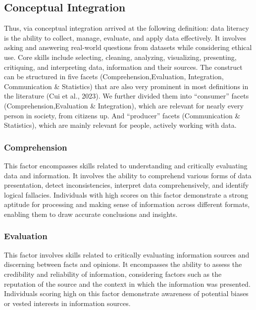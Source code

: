 \documentclass[
  12pt,
  a4paper,
  twoside]{article}
\begin{document}
\subsection{Conceptual Integration}\label{conceptual-integration}

Thus, via conceptual integration arrived at the following definition:
data literacy is the ability to collect, manage, evaluate, and apply
data effectively. It involves asking and answering real-world questions
from datasets while considering ethical use. Core skills include
selecting, cleaning, analyzing, visualizing, presenting, critiquing, and
interpreting data, information and their sources. The construct can be
structured in five facets (Comprehension,Evaluation, Integration,
Communication \& Statistics) that are also very prominent in most
definitions in the literature (Cui et al., 2023). We further divided
them into ``consumer'' facets (Comprehension,Evaluation \& Integration),
which are relevant for nearly every person in society, from citizens up.
And ``producer'' facets (Communication \& Statistics), which are mainly
relevant for people, actively working with data.

\subsubsection{Comprehension}\label{comprehension}

This factor encompasses skills related to understanding and critically
evaluating data and information. It involves the ability to comprehend
various forms of data presentation, detect inconsistencies, interpret
data comprehensively, and identify logical fallacies. Individuals with
high scores on this factor demonstrate a strong aptitude for processing
and making sense of information across different formats, enabling them
to draw accurate conclusions and insights.

\subsubsection{Evaluation}\label{evaluation}

This factor involves skills related to critically evaluating information
sources and discerning between facts and opinions. It encompasses the
ability to assess the credibility and reliability of information,
considering factors such as the reputation of the source and the context
in which the information was presented. Individuals scoring high on this
factor demonstrate awareness of potential biases or vested interests in
information sources.
\end{document}

